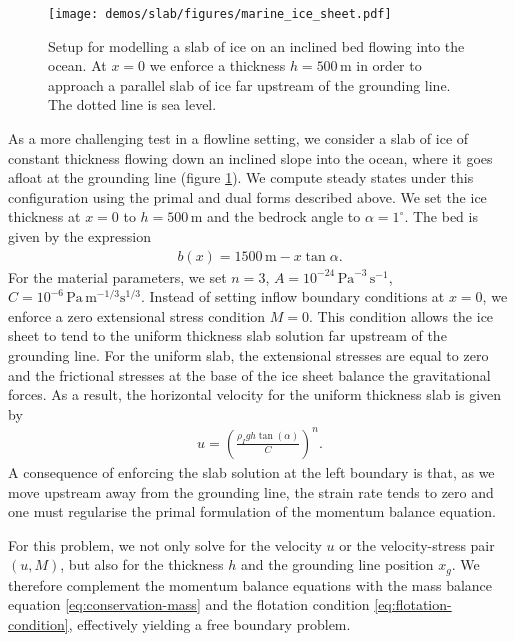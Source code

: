 \documentclass[review,oneside]{igs}
\begin{document}
\begin{figure}[h]
\centering
    \texttt{[image: demos/slab/figures/marine\_ice\_sheet.pdf]}
    \caption{Setup for modelling a slab of ice on an inclined bed flowing into the ocean.
    At $x = 0$ we enforce a thickness $h = 500\,\mathrm{m}$ in order to approach a parallel slab of ice far upstream of the grounding line. The dotted line is sea level.}
    \label{fig:domain_parallel_slab}
\end{figure}

As a more challenging test in a flowline setting, we consider a slab of ice of constant thickness flowing down an inclined slope into the ocean, where it goes afloat at the grounding line (figure \ref{fig:domain_parallel_slab}).
We compute steady states under this configuration using the primal and dual forms described above.
We set the ice thickness at $x = 0$ to $h = 500\, \mathrm{m}$ and the bedrock angle to $\alpha = 1^\circ$. The bed is given by the expression
\begin{align}
    b(x) = 1500\,\mathrm{m} - x\tan{\alpha}.
\end{align}
%
For the material parameters, we set $n = 3$, $A = 10^{-24}\,\mathrm{Pa}^{-3}\,\mathrm{s}^{-1}$, $C = 10^{-6}\,\mathrm{Pa}\,\mathrm{m}^{-1/3}\mathrm{s}^{1/3}$.
Instead of setting inflow boundary conditions at $x = 0$, we enforce a zero extensional stress condition $M = 0$.
This condition allows the ice sheet to tend to the uniform thickness slab solution far upstream of the grounding line.
For the uniform slab, the extensional stresses are equal to zero and the frictional stresses at the base of the ice sheet balance the gravitational forces.
As a result, the horizontal velocity for the uniform thickness slab is given by
\begin{align}\label{eq:u_slab}
    u = \left(\frac{\rho_I g h \tan(\alpha)}{C}\right)^n.
\end{align}
A consequence of enforcing the slab solution at the left boundary is that, as we move upstream away from the grounding line, the strain rate tends to zero and one must regularise the primal formulation of the momentum balance equation.

For this problem, we not only solve for the velocity $u$ or the velocity-stress pair $(u,M)$, but also for the thickness $h$ and the grounding line position $x_g$.
We therefore complement the momentum balance equations with the mass balance equation \eqref{eq:conservation-mass} and the flotation condition \eqref{eq:flotation-condition}, effectively yielding a free boundary problem.
\end{document}

